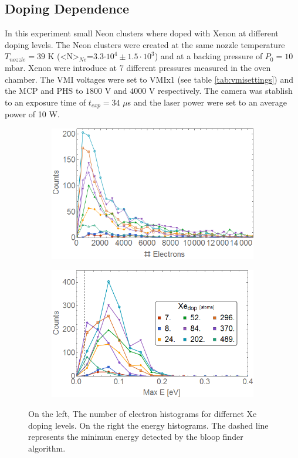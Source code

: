 \subsection{Doping Dependence }

In this experiment small Neon clusters where doped with Xenon at different doping levels. The Neon clusters were created at the same nozzle temperature $T_{nozzle}=39$ K (<N>$_{Ne}$=3.3$\cdot10^{4}\pm 1.5\cdot10^{3}$) and at a backing pressure of $P_{0}=10$ mbar. Xenon were introduce at 7 different pressures measured in the oven chamber. The VMI voltages were set to VMIx1  (see table \ref{tab:vmisettings}) and the MCP and PHS to $1800$ V and $4000$ V respectively. The camera was stablish to an exposure time of $t_{exp}=34$ $\mu$s  and the laser power were set to an average power of 10 W.


\begin{figure}[h!]
\hfill
\begin{subfigure}[l]{0.48\textwidth}
\includegraphics[width=1\textwidth]{../Images/results/MIR_Ne_XeDop_39K/HElec.png} 
\end{subfigure} 
\begin{subfigure}[l]{0.48\textwidth}
\includegraphics[width=1\textwidth]{../Images/results/MIR_Ne_XeDop_39K/HEnergc.png} 
\end{subfigure} \hfill

\caption[MIR Ne-Xe doping scan.Histograms]{On the left, The number of electron histograms for differnet Xe doping levels. On the right the energy histograms. The dashed line represents the minimun energy detected by the bloop finder algorithm.}
\label{fig:NeonXedophisto}
\end{figure}


